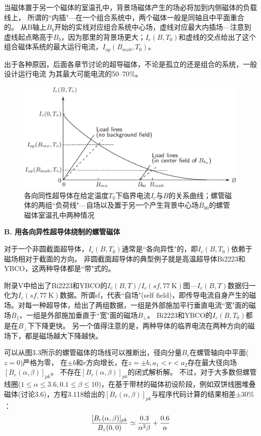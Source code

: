 当磁体置于另一个磁体的室温孔中，背景场磁体产生的场必将加到内侧磁体的负载线上，
所谓的``内插"---在一个组合系统中，两个磁体一般是同轴且中平面重合的。
从B轴上$B_{b}$开始的实线对应组合系统中心场，虚线对应最大内插场---注意到虚线起点略高于$B_{b}$，因为那里的背景场更大；$I_c(B,T_0)$和虚线的交点给出了这个组合磁体系统的最大运行电流，$I_{op}(B_{mxb},T_0)$。

出于各种原因，后面各章节讨论的超导磁体，不论是孤立的还是组合的系统，一般设计运行电流
为其最大可能电流的50–70\%。

\begin{figure}[htbp]
	\centering
	\includegraphics[scale=0.5]{chpt3/figs/fig3.19.eps}
	\caption{各向同性超导体在给定温度$T_0$下临界电流$I_c$与$B$的关系曲线；螺管磁体的两组``负荷线"---自场以及置于另一个产生背景中心场$B_{b0}$的螺管磁体室温孔中两种情况}
\end{figure}

\textbf{B. 用各向异性超导体绕制的螺管磁体}

对于一个非圆截面超导体，$I_c(B,T_0)$通常是``各向异性"的，即$I_c(B,T_0)$依赖于磁场相对于截面的方向。
非圆截面超导体的典型例子就是高温超导体Bi2223和YBCO，这两种导体都是``带"式的。

附录V中给出了Bi2223和YBCO的$I_c(B, T)/I_c(sf,77\ \mathrm{K})$图---$I_c(B, T)$数据归一化为$I_c(sf,77\ \mathrm{K})$数据。所谓sf，代表``自场"(self field)，即传导电流自身产生的磁场。对每一种超导体，给出了两组数据，一组是外部施加平行垂直电流``宽"面的磁场$B_{\parallel}$，一组是外部施加垂直于``宽"面的磁场$B_{\perp}$。 
Bi2223和YBCO的$I_c(B,T_0)$都是在$B_{\perp}$下下降更快。
另一个值得注意的是，两种导体的临界电流在两种方向的磁场下，都是磁场越大下降越快。

可以从图3.3所示的螺管磁体的场线可以推断出，径向分量$B_r$在螺管轴向中平面($z=0$)严格为零，
在$\pm b$和$r$方向增长，在$z=\pm b,a_1 < r < a_2$存在最大径向场$[B_r(\alpha,\beta)]_{pk}$。
不存在$[B_r(\alpha,\beta)]_{pk}$的闭式解析解。
不过，对于大多数但螺管线圈($1\le \alpha \le 3.6 , 0.1\le \beta \le 10$)，在基于带材的磁体初设阶段，例如双饼线圈堆叠磁体(讨论3.6)，方程3.118给出的$[B_{r}(\alpha,\beta)]_{pk}$与程序代码计算的结果相差$\pm 30\%$：
\begin{equation}
 \frac{[B_{r}(\alpha,\beta)]_{pk}}{B_{z}(0,0)}\simeq\frac{0.3}{\alpha^{2}\beta}+\frac{0.6}{\alpha}\\%
\end{equation}

